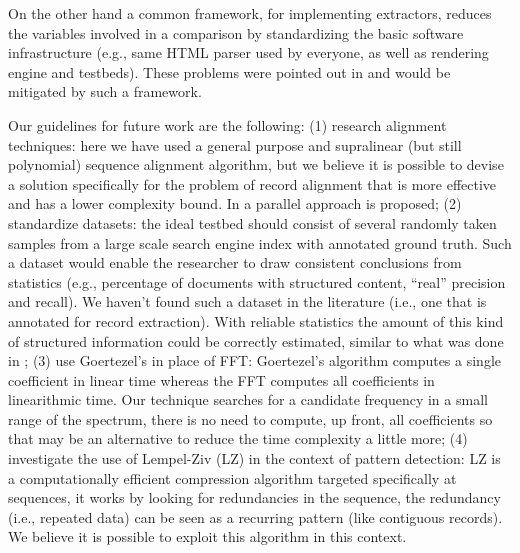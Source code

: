 On the other hand a common framework, for implementing extractors,
reduces the variables involved in a comparison by standardizing the basic
software infrastructure (e.g., same HTML parser used by everyone, as well as
rendering engine and testbeds). These problems were pointed out
in \cite{survey2013,survey2014} and would be mitigated by such a framework.
 
Our guidelines for future work are the following:
  (1) research alignment techniques: here we have used a general purpose and
  supralinear (but still polynomial) sequence alignment algorithm, but we
  believe it is possible to devise a solution specifically for the problem of
  record alignment that is more effective and has a lower complexity bound. In
  \cite{gfrerer2017parallel} a parallel approach is proposed;
  (2) standardize datasets: the ideal testbed should consist of several
  randomly taken samples from a large scale search engine index with annotated
  ground truth.
  Such a dataset would enable the researcher to draw consistent conclusions
  from statistics (e.g., percentage of documents with structured content,
  ``real'' precision and recall). We haven't found such a dataset in the
  literature (i.e., one that is annotated for record extraction). With reliable
  statistics the amount of this kind of structured information could be
  correctly estimated, similar to what was done in \cite{webtables2008};
  (3) use Goertezel's \cite{goertzel1958algorithm} in place of FFT:
  Goertezel's algorithm computes a single coefficient in linear time whereas the
  FFT computes all coefficients in linearithmic time. Our technique searches for a
  candidate frequency in a small range of the spectrum, there is no need to
  compute, up front, all coefficients so that may be an alternative to reduce
  the time complexity a little more;
  (4) investigate the use of Lempel-Ziv\cite{ziv1977universal} (LZ) in the
  context of pattern detection: LZ is a computationally efficient compression
  algorithm targeted specifically at sequences, it works by looking for
  redundancies in the sequence, the redundancy (i.e., repeated data) can be seen
  as a recurring pattern (like contiguous records). We believe it is
  possible to exploit this algorithm in this context.

